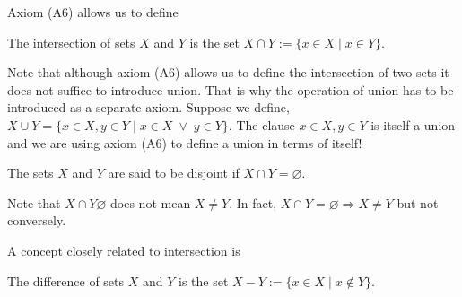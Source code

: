 Axiom (A6) allows us to define
\begin{defn}\label{c2s1d3}
The intersection of sets $X$ and $Y$ is the set $X \cap Y := \{x \in X
\;|\; x \in Y\}$.
\end{defn}
Note that although axiom (A6) allows us to define the intersection of two
sets it does not suffice to introduce union. That is why the operation of 
union has to be introduced as a separate axiom. Suppose we define, $X \cup
Y = \{x \in X, y \in Y \;|\; x \in X \;\lor\; y \in Y\}$. The clause $x \in
X, y \in Y$ is itself a union and we are using axiom (A6) to define a union
in terms of itself!

\begin{defn}\label{c2s1d4}
The sets $X$ and $Y$ are said to be disjoint if $X \cap Y = \varnothing$.
\end{defn}
Note that $X \cap Y \varnothing$ does not mean $X \ne Y$. In fact, $X
\cap Y = \varnothing \Rightarrow X \ne Y$ but not conversely.

A concept closely related to intersection is
\begin{defn}\label{c2s1d5}
The difference of sets $X$ and $Y$ is the set $X - Y := \{x \in X
\;|\; x \notin Y\}$.
\end{defn}

